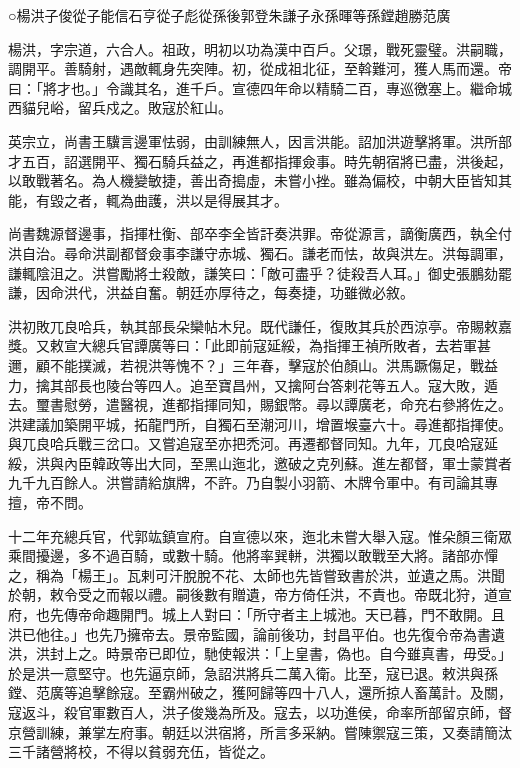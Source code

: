 
\begin{pinyinscope}
○楊洪子俊從子能信石亨從子彪從孫後郭登朱謙子永孫暉等孫鏜趙勝范廣

楊洪，字宗道，六合人。祖政，明初以功為漢中百戶。父璟，戰死靈璧。洪嗣職，調開平。善騎射，遇敵輒身先突陣。初，從成祖北征，至斡難河，獲人馬而還。帝曰：「將才也。」令識其名，進千戶。宣德四年命以精騎二百，專巡徼塞上。繼命城西貓兒峪，留兵戍之。敗寇於紅山。

英宗立，尚書王驥言邊軍怯弱，由訓練無人，因言洪能。詔加洪遊擊將軍。洪所部才五百，詔選開平、獨石騎兵益之，再進都指揮僉事。時先朝宿將已盡，洪後起，以敢戰著名。為人機變敏捷，善出奇搗虛，未嘗小挫。雖為偏校，中朝大臣皆知其能，有毀之者，輒為曲護，洪以是得展其才。

尚書魏源督邊事，指揮杜衡、部卒李全皆訐奏洪罪。帝從源言，謫衡廣西，執全付洪自治。尋命洪副都督僉事李謙守赤城、獨石。謙老而怯，故與洪左。洪每調軍，謙輒陰沮之。洪嘗勵將士殺敵，謙笑曰：「敵可盡乎？徒殺吾人耳。」御史張鵬劾罷謙，因命洪代，洪益自奮。朝廷亦厚待之，每奏捷，功雖微必敘。

洪初敗兀良哈兵，執其部長朵欒帖木兒。既代謙任，復敗其兵於西涼亭。帝賜敕嘉獎。又敕宣大總兵官譚廣等曰：「此即前寇延綏，為指揮王禎所敗者，去若軍甚邇，顧不能撲滅，若視洪等愧不？」三年春，擊寇於伯顏山。洪馬蹶傷足，戰益力，擒其部長也陵台等四人。追至寶昌州，又擒阿台答剌花等五人。寇大敗，遁去。璽書慰勞，遣醫視，進都指揮同知，賜銀幣。尋以譚廣老，命充右參將佐之。洪建議加築開平城，拓龍門所，自獨石至潮河川，增置堠臺六十。尋進都指揮使。與兀良哈兵戰三岔口。又嘗追寇至亦把禿河。再遷都督同知。九年，兀良哈寇延綏，洪與內臣韓政等出大同，至黑山迤北，邀破之克列蘇。進左都督，軍士蒙賞者九千九百餘人。洪嘗請給旗牌，不許。乃自製小羽箭、木牌令軍中。有司論其專擅，帝不問。

十二年充總兵官，代郭竑鎮宣府。自宣德以來，迤北未嘗大舉入寇。惟朵顏三衛眾乘間擾邊，多不過百騎，或數十騎。他將率巽軿，洪獨以敢戰至大將。諸部亦憚之，稱為「楊王」。瓦剌可汗脫脫不花、太師也先皆嘗致書於洪，並遺之馬。洪聞於朝，敕令受之而報以禮。嗣後數有贈遺，帝方倚任洪，不責也。帝既北狩，道宣府，也先傳帝命趣開門。城上人對曰：「所守者主上城池。天已暮，門不敢開。且洪已他往。」也先乃擁帝去。景帝監國，論前後功，封昌平伯。也先復令帝為書遺洪，洪封上之。時景帝已即位，馳使報洪：「上皇書，偽也。自今雖真書，毋受。」於是洪一意堅守。也先逼京師，急詔洪將兵二萬入衛。比至，寇已退。敕洪與孫鏜、范廣等追擊餘寇。至霸州破之，獲阿歸等四十八人，還所掠人畜萬計。及關，寇返斗，殺官軍數百人，洪子俊幾為所及。寇去，以功進侯，命率所部留京師，督京營訓練，兼掌左府事。朝廷以洪宿將，所言多采納。嘗陳禦寇三策，又奏請簡汰三千諸營將校，不得以貧弱充伍，皆從之。


\end{pinyinscope}
